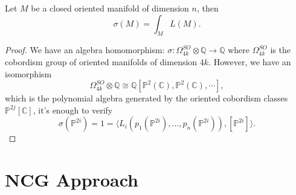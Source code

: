 \documentclass[10pt]{article}
\begin{document}
\begin{theorem}
  Let $ M$ be a closed oriented manifold of dimension $ n$, then
  \begin{equation*}
    \sigma(M) = \int _{M} L(M).
  \end{equation*}
\end{theorem}
\begin{proof}
  We have an algebra homomorphism: $ \sigma: \Omega^{SO}_{4 k} \otimes \mathbb{Q} \rightarrow \mathbb{Q}$ where $ \Omega_{4k}^{SO}$ is the cobordism group of oriented manifolds of dimension $ 4k$. However, we have an isomorphism
  \begin{equation*}
    \Omega^{SO}_{4k} \otimes \mathbb{Q} \cong \mathbb{Q}[\mathbb{P}^{2}(\mathbb{C}), \mathbb{P}^{2}(\mathbb{C}),\cdots ],
  \end{equation*}
  which is the polynomial algebra generated by the oriented cobordism classes $ \mathbb{P}^{2j}[\mathbb{C}]$, it's enough to verify
  \begin{equation*}
    \sigma (\mathbb {P} ^{2i})=1=\langle L_{i}(p_{1}(\mathbb {P} ^{2i}),\ldots ,p_{n}(\mathbb {P} ^{2i})),[\mathbb {P} ^{2i}]\rangle.
  \end{equation*}
\end{proof}

\section{NCG Approach}

\label{LastPage}
\end{document}
